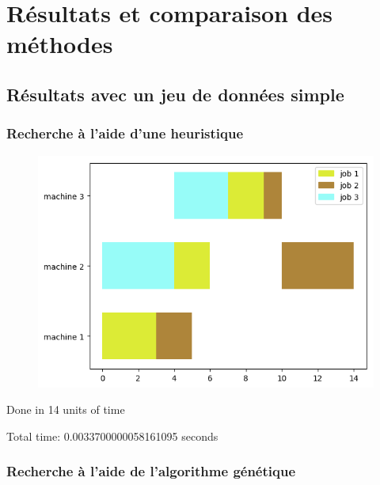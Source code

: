 \section{Résultats et comparaison des méthodes}

\subsection{Résultats avec un jeu de données simple}

\subsubsection{Recherche à l'aide d'une heuristique}

\begin{figure}[!h]
    \centering
    \includegraphics[]{results/test_shortest_operation.png}
\end{figure}

Done in 14 units of time

Total time: 0.0033700000058161095 seconds 
\frameboxend

\newpage

\subsubsection{Recherche à l'aide de l'algorithme génétique}

